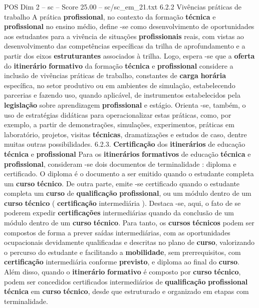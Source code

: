 \begin{textsample}{POS Dim 2 – sc – Score 25.00 – sc/sc\_em\_21.txt}  \label{ex:f2_pos_003}
6.2.2 Vivências práticas de trabalho A prática \textbf{profissional}, no contexto da formação \textbf{técnica} e \textbf{profissional} no ensino médio, define -se como desenvolvimento de oportunidades aos estudantes para a vivência de situações \textbf{profissionais} reais, com vistas ao desenvolvimento das competências específicas da trilha de aprofundamento e a partir dos eixos \textbf{estruturantes} associados à trilha.
Logo, espera -se que a \textbf{oferta} do \textbf{itinerário} \textbf{formativo} da formação \textbf{técnica} e \textbf{profissional} considere a inclusão de vivências práticas de trabalho, constantes de \textbf{carga} \textbf{horária} específica, no setor produtivo ou em ambientes de simulação, estabelecendo parcerias e fazendo uso, quando aplicável, de instrumentos estabelecidos pela \textbf{legislação} sobre aprendizagem \textbf{profissional} e estágio.
Orienta -se, também, o uso de estratégias didáticas para operacionalizar estas práticas, como, por exemplo, a partir de demonstrações, simulações, experimentos, práticas em laboratório, projetos, visitas \textbf{técnicas}, dramatizações e estudos de caso, dentre muitas outras possibilidades. 6.2.3. \textbf{Certificação} dos \textbf{itinerários} de educação \textbf{técnica} e \textbf{profissional} Para os \textbf{itinerários} \textbf{formativos} de educação \textbf{técnica} e \textbf{profissional}, consideram -se dois documentos de terminalidade : diploma e certificado.
O diploma é o documento a ser emitido quando o estudante completa um \textbf{curso} \textbf{técnico}.
De outra parte, emite -se certificado quando o estudante completa um \textbf{curso} de \textbf{qualificação} \textbf{profissional}, ou um módulo dentro de um \textbf{curso} \textbf{técnico} ( \textbf{certificação} intermediária ).
Destaca -se, aqui, o fato de se poderem expedir \textbf{certificações} intermediárias quando da conclusão de um módulo dentro de um \textbf{curso} \textbf{técnico}.
Para tanto, os \textbf{cursos} \textbf{técnicos} podem ser compostos de forma a prever saídas intermediárias, com as oportunidades ocupacionais devidamente qualificadas e descritas no plano de \textbf{curso}, valorizando o percurso do estudante e facilitando a \textbf{mobilidade}, sem prerrequisitos, com \textbf{certificação} intermediária conforme \textbf{previsto}, e diploma ao final do \textbf{curso}.
Além disso, quando o \textbf{itinerário} \textbf{formativo} é composto por \textbf{curso} \textbf{técnico}, podem ser concedidos certificados intermediários de \textbf{qualificação} \textbf{profissional} \textbf{técnica} em \textbf{curso} \textbf{técnico}, desde que estruturado e organizado em etapas com terminalidade.

\end{textsample}
